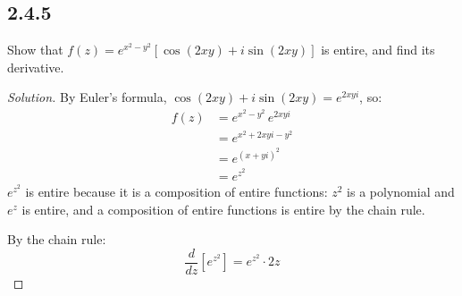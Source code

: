 \documentclass{article}
\newenvironment{solution}{
\begin{proof}[Solution]}{
\end{proof}}
\begin{document}
\subsection*{2.4.5}
Show that $f(z) = e^{x^2 - y^2}\left[\cos(2xy) + i\sin(2xy)\right]$ is entire, and
find its derivative.
\begin{solution}
  By Euler's formula, $\cos(2xy) + i\sin(2xy) = e^{2xyi}$, so:
  \begin{align*}
    f(z) &= e^{x^2 - y^2}\, e^{2xyi}
    \\ &= e^{x^2 + 2xyi - y^2}
    \\ &= e^{(x + yi)^2}
    \\ &= e^{z^2}
  \end{align*}
  $e^{z^2}$ is entire because it is a composition of entire functions: $z^2$ is a
  polynomial and $e^z$ is entire, and a composition of entire functions is entire by
  the chain rule.

  By the chain rule:
  \[
    \frac{d}{dz}\left[e^{z^2}\right] = e^{z^2} \cdot 2z
  \]
\end{solution}
\end{document}
